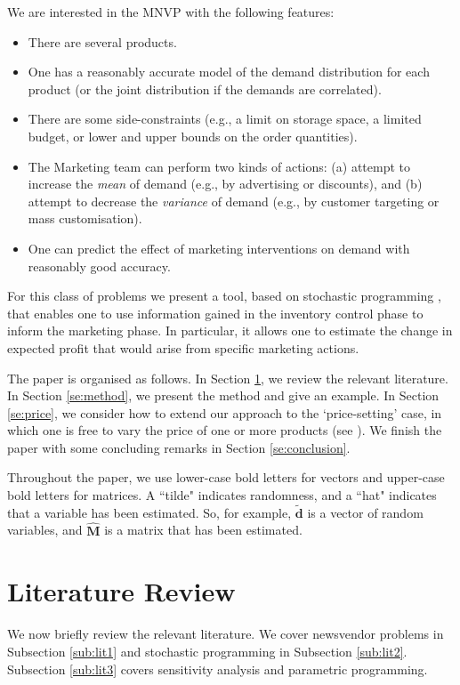 \documentclass[a4paper,11pt]{article}
\begin{document}
We are interested in the MNVP with the following features:
\begin{itemize}
\item There are several products.
\item One has a reasonably accurate model of the demand distribution for each product (or the joint distribution if the demands are correlated).
\item There are some side-constraints (e.g., a limit on storage space, a limited budget, or lower and upper bounds on the order quantities).
\item The Marketing team can perform two kinds of actions: (a) attempt to increase the \emph{mean} of demand (e.g., by advertising or discounts), and (b) attempt to decrease the \emph{variance} of demand (e.g., by customer targeting or mass customisation).
\item One can predict the effect of marketing interventions on demand with reasonably good accuracy.
\end{itemize}

For this class of problems we present a tool, based on stochastic programming \cite{Da55,We84}, that enables one to use information gained in the inventory control phase to inform the marketing phase. In particular, it allows one to estimate the change in expected profit that would arise from specific marketing actions.

The paper is organised as follows. In Section \ref{se:literature}, we review the relevant literature. In Section \ref{se:method}, we present the method and give an example. In Section \ref{se:price}, we consider how to extend our approach to the `price-setting' case, in which one is free to vary the price of one or more products (see \cite{De20}). We finish the paper with some concluding remarks in Section \ref{se:conclusion}.

Throughout the paper, we use lower-case bold letters for vectors and upper-case bold letters for matrices. A ``tilde" indicates randomness, and a ``hat" indicates that a variable has been estimated. So, for example, $\mathbf{\tilde d}$ is a vector of random variables, and $\hat{\mathbf{M}}$ is a matrix that has been estimated.

\section{Literature Review} \label{se:literature}

We now briefly review the relevant literature. We cover newsvendor problems in Subsection \ref{sub:lit1} and stochastic programming in Subsection \ref{sub:lit2}. Subsection  \ref{sub:lit3} covers sensitivity analysis and parametric programming.
\end{document}
